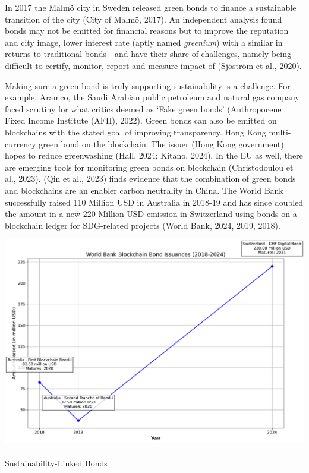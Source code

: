 \documentclass[
  letterpaper,
  DIV=11,
  numbers=noendperiod]{scrartcl}
\makeatletter
\let\oldparagraph\paragraph
\renewcommand{\paragraph}{
    \@ifstar
      \xxxParagraphStar
      \xxxParagraphNoStar
  }
\newcommand{\xxxParagraphStar}[1]{\oldparagraph*{#1}\mbox{}}
\newcommand{\xxxParagraphNoStar}[1]{\oldparagraph{#1}\mbox{}}
\makeatother
\begin{document}
In 2017 the Malmö city in Sweden released green bonds to finance a
sustainable transition of the city (City of Malmö, 2017). An independent
analysis found bonds may not be emitted for financial reasons but to
improve the reputation and city image, lower interest rate (aptly named
\emph{greenium}) with a similar in returns to traditional bonds - and
have their share of challenges, namely being difficult to certify,
monitor, report and measure impact of (Sjöström et al., 2020).

Making sure a green bond is truly supporting sustainability is a
challenge. For example, Aramco, the Saudi Arabian public petroleum and
natural gas company faced scrutiny for what critics deemed as `Fake
green bonds' (Anthropocene Fixed Income Institute (AFII), 2022). Green
bonds can also be emitted on blockchains with the stated goal of
improving transparency. Hong Kong multi-currency green bond on the
blockchain. The issuer (Hong Kong government) hopes to reduce
greenwashing (Hall, 2024; Kitano, 2024). In the EU as well, there are
emerging tools for monitoring green bonds on blockchain (Christodoulou
et al., 2023). (Qin et al., 2023) finds evidence that the combination of
green bonds and blockchains are an enabler carbon neutrality in China.
The World Bank successfully raised 110 Million USD in Australia in
2018-19 and has since doubled the amount in a new 220 Million USD
emission in Switzerland using bonds on a blockchain ledger for
SDG-related projects (World Bank, 2024, 2019, 2018).

\includegraphics{_thesis_files/figure-pdf/cell-42-output-1.pdf}

\paragraph{Sustainability-Linked
Bonds}\label{sustainability-linked-bonds}
\end{document}
